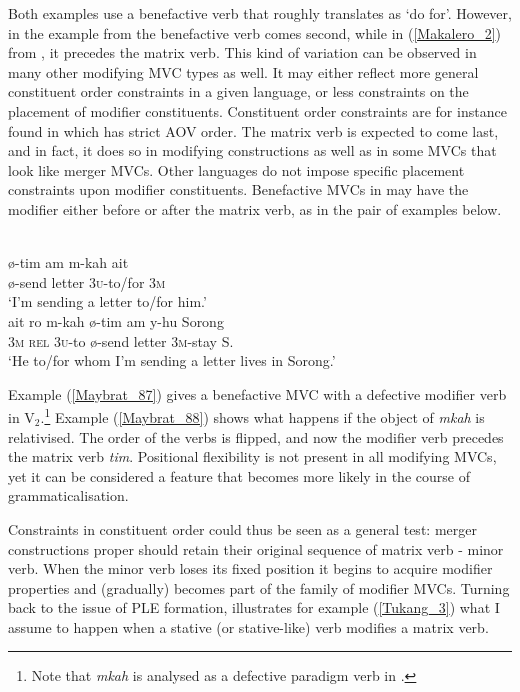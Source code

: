 Both examples use a benefactive verb that roughly translates as `do for'. However, in the example from  the benefactive verb comes second, while in (\ref{Makalero_2}) from , it precedes the matrix verb. This kind of variation can be observed in many other modifying MVC types as well. It may either reflect more general constituent order constraints in a given language, or less constraints on the placement of modifier constituents. Constituent order constraints are for instance found in  which has strict AOV order. The matrix verb is expected to come last, and in fact, it does so in modifying constructions as well as in some  MVCs that look like merger MVCs. Other languages do not impose specific placement constraints upon modifier constituents. Benefactive MVCs in  may have the modifier either before or after the matrix verb, as in the pair of examples below.

\ea \label{Maybrat_87}
\\
\ea
\gll ø-tim am m-kah ait \\
ø-send letter 3\textsc{u}-to/for 3\textsc{m} \\
\glft `I'm sending a letter to/for him.'\\
\ex \label{Maybrat_88}
\gll ait ro m-kah ø-tim am y-hu Sorong\\
3\textsc{m} \textsc{rel} 3\textsc{u}-to ø-send letter 3\textsc{m}-stay S. \\
\glft `He to/for whom I'm sending a letter lives in Sorong.' \\ 
\z
\z

Example (\ref{Maybrat_87}) gives a benefactive MVC with a defective modifier verb in V$_2$.\footnote{Note that \textit{mkah} is analysed as a defective paradigm verb in \citet[80]{dol2007grammar}.} Example (\ref{Maybrat_88}) shows what happens if the object of \textit{mkah} is relativised. The order of the verbs is flipped, and now the modifier verb precedes the matrix verb \textit{tim}. Positional flexibility is not present in all modifying MVCs, yet it can be considered a feature that becomes more likely in the course of grammaticalisation.

Constraints in constituent order could thus be seen as a general test: merger constructions proper should retain their original sequence of matrix verb - minor verb. When the minor verb loses its fixed position it begins to acquire modifier properties and (gradually) becomes part of the family of modifier MVCs. Turning back to the issue of PLE formation,  illustrates for example (\ref{Tukang_3}) what I assume to happen when a stative (or stative-like) verb modifies a matrix verb.

